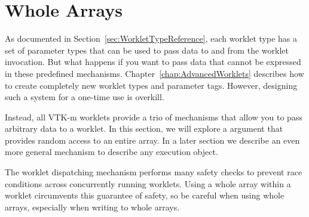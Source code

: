 








\section{Whole Arrays}
\label{sec:WholeArrays}


As documented in Section~\ref{sec:WorkletTypeReference}, each worklet type
has a set of parameter types that can be used to pass data to and from the
worklet invocation. But what happens if you want to pass data that cannot
be expressed in these predefined mechanisms.
Chapter~\ref{chap:AdvancedWorklets} describes how to create completely new
worklet types and parameter tags. However, designing such a system for a
one-time use is overkill.

Instead, all VTK-m worklets provide a trio of mechanisms that allow you to pass arbitrary data to a worklet.
In this section, we will explore a  argument that provides random access to an entire array.
In a later section we describe an even more general mechanism to describe any execution object.

\begin{commonerrors}
  The \VTKm worklet dispatching mechanism performs many safety checks to prevent race conditions across concurrently running worklets.
  Using a whole array within a worklet circumvents this guarantee of safety, so be careful when using whole arrays, especially when writing to whole arrays.
\end{commonerrors}

